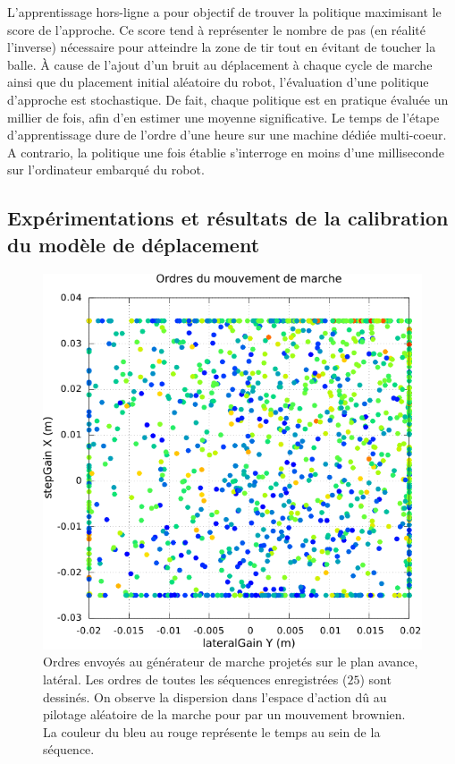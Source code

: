 L'apprentissage hors-ligne a pour objectif de trouver la politique
maximisant le score de l'approche.
Ce score tend à représenter le nombre de pas (en réalité l'inverse) nécessaire pour atteindre
la zone de tir tout en évitant de toucher la balle.
À cause de l'ajout d'un bruit au déplacement à chaque cycle de marche 
ainsi que du placement initial aléatoire du robot, 
l'évaluation d'une politique d'approche est stochastique.
De fait, chaque politique est en pratique évaluée un millier de fois, 
afin d'en estimer une moyenne significative.
Le temps de l'étape d'apprentissage dure de l'ordre d'une 
heure sur une machine dédiée multi-coeur.
A contrario, la politique une fois établie s'interroge en moins 
d'une milliseconde sur l'ordinateur embarqué du robot.

\subsection{Expérimentations et résultats de la calibration du modèle de déplacement}

\begin{figure}[htb]
    \centerfloat
    \includegraphics[type=pdf,ext=.pdf,read=.pdf,width=0.65\linewidth]{../plot/OdometryCMAES/walk_orders}
    \caption{\label{fig:odometry_cmaes_walk_orders} 
        Ordres envoyés au générateur de marche projetés sur le plan avance, latéral.
        Les ordres de toutes les séquences enregistrées ($25$) sont dessinés.
        On observe la dispersion dans l'espace d'action 
        dû au pilotage aléatoire de la marche pour par un mouvement brownien.
        La couleur du bleu au rouge représente le temps au sein de la séquence.
    }
\end{figure}

